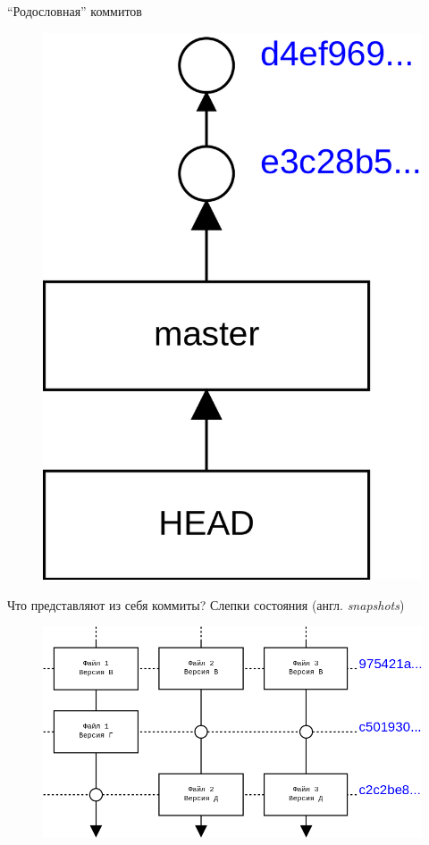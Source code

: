 \documentclass[presentation]{beamer}
\begin{document}
\begin{frame}{``Родословная'' коммитов}
  \begin{figure}[htb]
    \centering
    \includegraphics[height=.9\textheight]{git-basics-1}
  \end{figure}
\end{frame}

\begin{frame}{Что представляют из себя коммиты?}
  \center \LARGE Слепки состояния (англ. \emph{snapshots})
  \begin{figure}[htb]
    \centering
    \includegraphics[width=.8\textwidth]{git-snapshots}
  \end{figure}
\end{frame}
\end{document}
